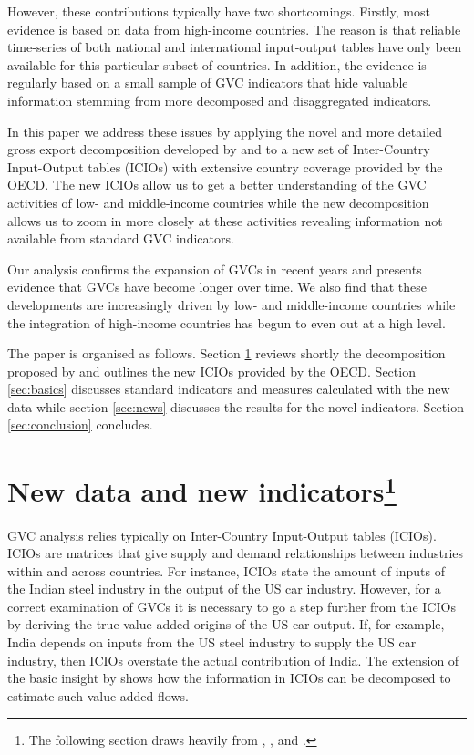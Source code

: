 \documentclass[11pt,a4paper]{article}
\begin{document}
However, these contributions typically have two shortcomings. Firstly, most evidence is based on data from high-income countries. The reason is that reliable time-series of both national and international input-output tables have only been available for this particular subset of countries. In addition, the evidence is regularly based on a small sample of GVC indicators that hide valuable information stemming from more decomposed and disaggregated indicators. 

In this paper we address these issues by applying the novel and more detailed gross export decomposition developed by \citet{zhwaetal13} and \citet{rokoetal14} to a new set of Inter-Country Input-Output tables (ICIOs) with extensive country coverage provided by the OECD. The new ICIOs allow us to get a better understanding of the GVC activities of low- and middle-income countries while the new decomposition allows us to zoom in more closely at these activities revealing information not available from standard GVC indicators.

Our analysis confirms the expansion of GVCs in recent years and presents evidence that GVCs have become longer over time. We also find that these developments are increasingly driven by low- and middle-income countries while the integration of high-income countries has begun to even out at a high level.

The paper is organised as follows. Section \ref{sec:data} reviews shortly the decomposition proposed by \citet[WWZ henceforth]{zhwaetal13} and outlines the new ICIOs provided by the OECD. Section \ref{sec:basics} discusses standard indicators and measures calculated with the new data while section \ref{sec:news} discusses the results for the novel indicators. Section \ref{sec:conclusion} concludes.



\section[New data and new indicators]{New data and new indicators\footnote{The following section draws heavily from \citet{zhwaetal13}, \citet{viku16}, and \cite{baquviku15}.}}\label{sec:data}

GVC analysis relies typically on Inter-Country Input-Output tables (ICIOs). ICIOs are matrices that give supply and demand relationships between industries within and across countries. For instance, ICIOs state the amount of inputs of the Indian steel industry in the output of the US car industry. However, for a correct examination of GVCs it is necessary to go a step further from the ICIOs by deriving the true value added origins of the US car output. If, for example, India depends on inputs from the US steel industry to supply the US car industry, then ICIOs overstate the actual contribution of India. The extension of the basic \citet{wale36} insight by \citet{dahuetal01} shows how the information in ICIOs can be decomposed to estimate such value added flows.
\end{document}
